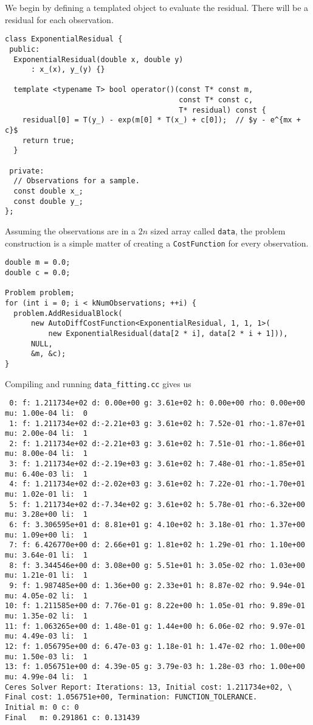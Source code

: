 We begin by defining a templated object to evaluate the residual. There will be a residual for each observation.
\begin{verbatim}
class ExponentialResidual {
 public:
  ExponentialResidual(double x, double y)
      : x_(x), y_(y) {}

  template <typename T> bool operator()(const T* const m,
                                        const T* const c,
                                        T* residual) const {
    residual[0] = T(y_) - exp(m[0] * T(x_) + c[0]);  // $y - e^{mx + c}$
    return true;
  }

 private:
  // Observations for a sample.
  const double x_;
  const double y_;
};
\end{verbatim}
Assuming the observations are in a $2n$ sized array called \texttt{data}, the problem construction is a simple matter of creating a \texttt{CostFunction} for every observation.
\clearpage
\begin{verbatim}
double m = 0.0;
double c = 0.0;

Problem problem;
for (int i = 0; i < kNumObservations; ++i) {
  problem.AddResidualBlock(
      new AutoDiffCostFunction<ExponentialResidual, 1, 1, 1>(
          new ExponentialResidual(data[2 * i], data[2 * i + 1])),
      NULL,
      &m, &c);
}
\end{verbatim}
Compiling and running \texttt{data\_fitting.cc} gives us
\begin{verbatim}
 0: f: 1.211734e+02 d: 0.00e+00 g: 3.61e+02 h: 0.00e+00 rho: 0.00e+00 mu: 1.00e-04 li:  0
 1: f: 1.211734e+02 d:-2.21e+03 g: 3.61e+02 h: 7.52e-01 rho:-1.87e+01 mu: 2.00e-04 li:  1
 2: f: 1.211734e+02 d:-2.21e+03 g: 3.61e+02 h: 7.51e-01 rho:-1.86e+01 mu: 8.00e-04 li:  1
 3: f: 1.211734e+02 d:-2.19e+03 g: 3.61e+02 h: 7.48e-01 rho:-1.85e+01 mu: 6.40e-03 li:  1
 4: f: 1.211734e+02 d:-2.02e+03 g: 3.61e+02 h: 7.22e-01 rho:-1.70e+01 mu: 1.02e-01 li:  1
 5: f: 1.211734e+02 d:-7.34e+02 g: 3.61e+02 h: 5.78e-01 rho:-6.32e+00 mu: 3.28e+00 li:  1
 6: f: 3.306595e+01 d: 8.81e+01 g: 4.10e+02 h: 3.18e-01 rho: 1.37e+00 mu: 1.09e+00 li:  1
 7: f: 6.426770e+00 d: 2.66e+01 g: 1.81e+02 h: 1.29e-01 rho: 1.10e+00 mu: 3.64e-01 li:  1
 8: f: 3.344546e+00 d: 3.08e+00 g: 5.51e+01 h: 3.05e-02 rho: 1.03e+00 mu: 1.21e-01 li:  1
 9: f: 1.987485e+00 d: 1.36e+00 g: 2.33e+01 h: 8.87e-02 rho: 9.94e-01 mu: 4.05e-02 li:  1
10: f: 1.211585e+00 d: 7.76e-01 g: 8.22e+00 h: 1.05e-01 rho: 9.89e-01 mu: 1.35e-02 li:  1
11: f: 1.063265e+00 d: 1.48e-01 g: 1.44e+00 h: 6.06e-02 rho: 9.97e-01 mu: 4.49e-03 li:  1
12: f: 1.056795e+00 d: 6.47e-03 g: 1.18e-01 h: 1.47e-02 rho: 1.00e+00 mu: 1.50e-03 li:  1
13: f: 1.056751e+00 d: 4.39e-05 g: 3.79e-03 h: 1.28e-03 rho: 1.00e+00 mu: 4.99e-04 li:  1
Ceres Solver Report: Iterations: 13, Initial cost: 1.211734e+02, \
Final cost: 1.056751e+00, Termination: FUNCTION_TOLERANCE.
Initial m: 0 c: 0
Final   m: 0.291861 c: 0.131439
\end{verbatim}

